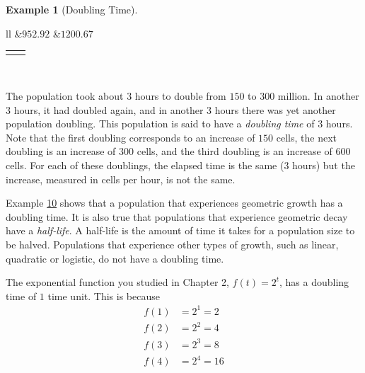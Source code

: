 \documentclass[10pt,]{book}
\theoremstyle{plain}
\theoremstyle{definition}
\theoremstyle{definition}
\newtheorem{example}[theorem]{Example}
\theoremstyle{definition}
\numberwithin{equation}{section}
\newcommand{\hrulemedium}{\noalign{\hrule height 0.07em}}
\newlength{\panelmax}
\begin{document}
\begin{example}[Doubling Time]
{{{{\begin{tabular}{ll}
&\(952.92\)\tabularnewline\hrulemedium
{}&\(1200.67\)\tabularnewline\hrulemedium
\end{tabular}
}}}
\ifdefined\phBtabular\else\newlength{\phBtabular}\fi%
\setlength{\phBtabular}{\ht\panelboxBtabular+\dp\panelboxBtabular}
\settototalheight{\phBtabular}{\usebox{\panelboxBtabular}}
\setlength{\panelmax}{\maxof{\panelmax}{\phBtabular}}
\leavevmode%
\setlength{\tabcolsep}{0\linewidth}
\par\medskip\noindent
\begin{tabular}{@{}*{2}{c}@{}}
\begin{minipage}[c][\panelmax][t]{0.5\linewidth}\usebox{\panelboxAtabular}\end{minipage}&
\begin{minipage}[c][\panelmax][t]{0.5\linewidth}\usebox{\panelboxBtabular}\end{minipage}\end{tabular}\\
}%
\par
\hypertarget{p-118}{}%
The population took about \(3\) hours to double from \(150\) to \(300\) million.  In another \(3\) hours, it had doubled again, and in another \(3\) hours there was yet another population doubling. This population is said to have a \emph{doubling time} of \(3\) hours. Note that the first doubling corresponds to an increase of \(150\) cells, the next doubling is an increase of \(300\) cells, and the third doubling is an increase of \(600\) cells. For each of these doublings, the elapsed time is the same (\(3\) hours) but the increase, measured in cells per hour, is not the same.%
\end{example}
\hypertarget{p-119}{}%
Example \hyperref[example-doubling-time]{10} shows that a population that experiences geometric growth has a doubling time. It is also true that populations that experience geometric decay have a \emph{half-life}. A half-life is the amount of time it takes for a population size to be halved. Populations that experience other types of growth, such as linear, quadratic or logistic, do not have a doubling time.%
\par
\hypertarget{p-120}{}%
The exponential function you studied in Chapter 2, \(f(t)=2^t\), has a doubling time of \(1\) time unit. This is because%
%
\begin{align*}
f(1)&=2^1=2\\
f(2)&=2^2=4\\
f(3)&=2^3=8\\
f(4)&=2^4=16
\end{align*}
\end{document}
